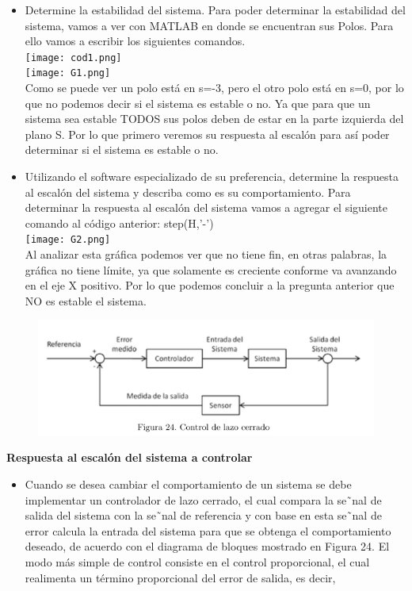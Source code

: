 \begin{itemize}
	\item Determine la estabilidad del sistema.
Para poder determinar la estabilidad del sistema, vamos a ver con MATLAB en donde se encuentran sus Polos. Para ello vamos a escribir los siguientes comandos.\\
\texttt{[image: cod1.png]}\\
\texttt{[image: G1.png]} \\
Como se puede ver un polo está en s=-3, pero el otro polo está en s=0, por lo que no podemos decir si el sistema es estable o no. Ya que para que un sistema sea estable TODOS sus polos deben de estar en la parte izquierda del plano S. Por lo que primero veremos su respuesta al escalón para así poder determinar si el sistema es estable o no.

	\item Utilizando el software especializado de su preferencia, determine la respuesta al escalón del sistema y describa como es su comportamiento.
Para determinar la respuesta al escalón del sistema vamos a agregar el siguiente comando al código anterior: step(H,'-')\\
\texttt{[image: G2.png]} \\
Al analizar esta gráfica podemos ver que no tiene fin, en otras palabras, la gráfica no tiene límite, ya que solamente es creciente conforme va avanzando en el eje X positivo. Por lo que podemos concluir a la pregunta anterior que NO es estable el sistema.

\end{itemize}

\begin{figure}[H]
	\centering
	\includegraphics[scale=0.7]{img2/fig24}
	\label{fig:fig24}
\end{figure}

\textbf{Respuesta al escalón del sistema a controlar}

\begin{itemize}
	\item Cuando se desea cambiar el comportamiento de un sistema se debe implementar un controlador de lazo
	cerrado, el cual compara la se˜nal de salida del sistema con la se˜nal de referencia y con base en esta se˜nal
	de error calcula la entrada del sistema para que se obtenga el comportamiento deseado, de acuerdo con
	el diagrama de bloques mostrado en Figura 24. El modo más simple de control consiste en el control
	proporcional, el cual realimenta un término proporcional del error de salida, es decir,
\end{itemize}


